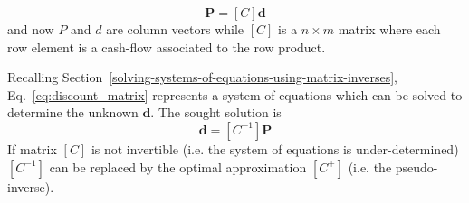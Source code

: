 \begin{equation}
\boldsymbol{P} = [C]\boldsymbol{d}
\label{eq:discount_matrix}
\end{equation}
and now $P$ and $d$ are column vectors while $[C]$ is a $n \times m$ matrix where each row element is a cash-flow associated to the row product.

Recalling Section~\ref{solving-systems-of-equations-using-matrix-inverses}, Eq.~\ref{eq:discount_matrix} represents a system of equations which can be solved to determine the unknown $\boldsymbol{d}$.
The sought solution is 
\begin{equation}
\boldsymbol{d} = [C^{-1}] \boldsymbol{P}
\end{equation} 
If matrix $[C]$ is not invertible (i.e. the system of equations is under-determined) $[C^{-1}]$ can be replaced by the optimal approximation $[C^+]$ (i.e. the pseudo-inverse). 

